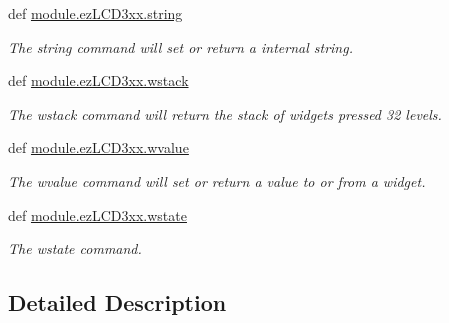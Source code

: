 \begin{DoxyCompactItemize}
def \hyperlink{group___widgets_gae2b2686b92f93d6fc84de7a19518a89f}{module.\-ez\-L\-C\-D3xx.\-string}
\begin{DoxyCompactList}\small\item\em The string command will set or return a internal string. \end{DoxyCompactList}\item 
def \hyperlink{group___widgets_ga223301539fa77d634fc44b480a08f6a7}{module.\-ez\-L\-C\-D3xx.\-wstack}
\begin{DoxyCompactList}\small\item\em The wstack command will return the stack of widgets pressed 32 levels. \end{DoxyCompactList}\item 
def \hyperlink{group___widgets_ga57c35a2e95d92bbeaeefc71ffd9998fc}{module.\-ez\-L\-C\-D3xx.\-wvalue}
\begin{DoxyCompactList}\small\item\em The wvalue command will set or return a value to or from a widget. \end{DoxyCompactList}\item 
def \hyperlink{group___widgets_ga68f19c87c7284b550f150b81327125aa}{module.\-ez\-L\-C\-D3xx.\-wstate}
\begin{DoxyCompactList}\small\item\em The wstate command. \end{DoxyCompactList}\end{DoxyCompactItemize}


\subsection{Detailed Description}


